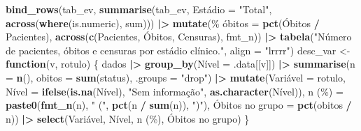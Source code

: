 \documentclass[
  brazilian,
]{article}
\newenvironment{Shaded}{\begin{snugshade}}{\end{snugshade}}
\newcommand{\AttributeTok}[1]{\textcolor[rgb]{0.13,0.29,0.53}{#1}}
\newcommand{\ControlFlowTok}[1]{\textcolor[rgb]{0.13,0.29,0.53}{\textbf{#1}}}
\newcommand{\FunctionTok}[1]{\textcolor[rgb]{0.13,0.29,0.53}{\textbf{#1}}}
\newcommand{\NormalTok}[1]{#1}
\newcommand{\OtherTok}[1]{\textcolor[rgb]{0.56,0.35,0.01}{#1}}
\newcommand{\SpecialCharTok}[1]{\textcolor[rgb]{0.81,0.36,0.00}{\textbf{#1}}}
\newcommand{\StringTok}[1]{\textcolor[rgb]{0.31,0.60,0.02}{#1}}
\begin{document}
\begin{Shaded}
\begin{Highlighting}[]
\FunctionTok{bind\_rows}\NormalTok{(tab\_ev, }\FunctionTok{summarise}\NormalTok{(tab\_ev, }\StringTok{\textasciigrave{}}\AttributeTok{Estádio}\StringTok{\textasciigrave{}} \OtherTok{=} \StringTok{"Total"}\NormalTok{, }\FunctionTok{across}\NormalTok{(}\FunctionTok{where}\NormalTok{(is.numeric), sum))) }\SpecialCharTok{|\textgreater{}}
  \FunctionTok{mutate}\NormalTok{(}\StringTok{\textasciigrave{}}\AttributeTok{\% óbitos}\StringTok{\textasciigrave{}} \OtherTok{=} \FunctionTok{pct}\NormalTok{(}\StringTok{\textasciigrave{}}\AttributeTok{Óbitos}\StringTok{\textasciigrave{}} \SpecialCharTok{/}\NormalTok{ Pacientes),}
         \FunctionTok{across}\NormalTok{(}\FunctionTok{c}\NormalTok{(Pacientes, }\StringTok{\textasciigrave{}}\AttributeTok{Óbitos}\StringTok{\textasciigrave{}}\NormalTok{, Censuras), fmt\_n)) }\SpecialCharTok{|\textgreater{}}
  \FunctionTok{tabela}\NormalTok{(}\StringTok{"Número de pacientes, óbitos e censuras por estádio clínico."}\NormalTok{, }\AttributeTok{align =} \StringTok{"lrrrr"}\NormalTok{)}
\NormalTok{desc\_var }\OtherTok{\textless{}{-}} \ControlFlowTok{function}\NormalTok{(v, rotulo) \{}
\NormalTok{  dados }\SpecialCharTok{|\textgreater{}}
    \FunctionTok{group\_by}\NormalTok{(}\StringTok{\textasciigrave{}}\AttributeTok{Nível}\StringTok{\textasciigrave{}} \OtherTok{=}\NormalTok{ .data[[v]]) }\SpecialCharTok{|\textgreater{}}
    \FunctionTok{summarise}\NormalTok{(}\AttributeTok{n =} \FunctionTok{n}\NormalTok{(), }\AttributeTok{obitos =} \FunctionTok{sum}\NormalTok{(status), }\AttributeTok{.groups =} \StringTok{"drop"}\NormalTok{) }\SpecialCharTok{|\textgreater{}}
    \FunctionTok{mutate}\NormalTok{(}\StringTok{\textasciigrave{}}\AttributeTok{Variável}\StringTok{\textasciigrave{}} \OtherTok{=}\NormalTok{ rotulo,}
           \StringTok{\textasciigrave{}}\AttributeTok{Nível}\StringTok{\textasciigrave{}} \OtherTok{=} \FunctionTok{ifelse}\NormalTok{(}\FunctionTok{is.na}\NormalTok{(}\StringTok{\textasciigrave{}}\AttributeTok{Nível}\StringTok{\textasciigrave{}}\NormalTok{), }\StringTok{"Sem informação"}\NormalTok{, }\FunctionTok{as.character}\NormalTok{(}\StringTok{\textasciigrave{}}\AttributeTok{Nível}\StringTok{\textasciigrave{}}\NormalTok{)),}
           \StringTok{\textasciigrave{}}\AttributeTok{n (\%)}\StringTok{\textasciigrave{}} \OtherTok{=} \FunctionTok{paste0}\NormalTok{(}\FunctionTok{fmt\_n}\NormalTok{(n), }\StringTok{" ("}\NormalTok{, }\FunctionTok{pct}\NormalTok{(n }\SpecialCharTok{/} \FunctionTok{sum}\NormalTok{(n)), }\StringTok{")"}\NormalTok{),}
           \StringTok{\textasciigrave{}}\AttributeTok{Óbitos no grupo}\StringTok{\textasciigrave{}} \OtherTok{=} \FunctionTok{pct}\NormalTok{(obitos }\SpecialCharTok{/}\NormalTok{ n)) }\SpecialCharTok{|\textgreater{}}
    \FunctionTok{select}\NormalTok{(}\StringTok{\textasciigrave{}}\AttributeTok{Variável}\StringTok{\textasciigrave{}}\NormalTok{, }\StringTok{\textasciigrave{}}\AttributeTok{Nível}\StringTok{\textasciigrave{}}\NormalTok{, }\StringTok{\textasciigrave{}}\AttributeTok{n (\%)}\StringTok{\textasciigrave{}}\NormalTok{, }\StringTok{\textasciigrave{}}\AttributeTok{Óbitos no grupo}\StringTok{\textasciigrave{}}\NormalTok{)}
\NormalTok{\}}


\end{Highlighting}
\end{Shaded}
\end{document}
